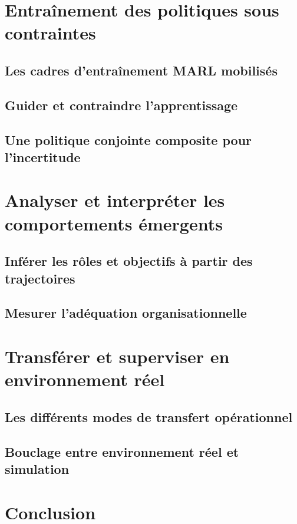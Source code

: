 \chapter{Entraînement des politiques sous contraintes}
\section{Les cadres d'entraînement MARL mobilisés}
\section{Guider et contraindre l'apprentissage}
\section{Une politique conjointe composite pour l'incertitude}

\chapter{Analyser et interpréter les comportements émergents}
\section{Inférer les rôles et objectifs à partir des trajectoires}
\section{Mesurer l'adéquation organisationnelle}

\chapter{Transférer et superviser en environnement réel}
\section{Les différents modes de transfert opérationnel}
\section{Bouclage entre environnement réel et simulation}

\chapter*{Conclusion}
